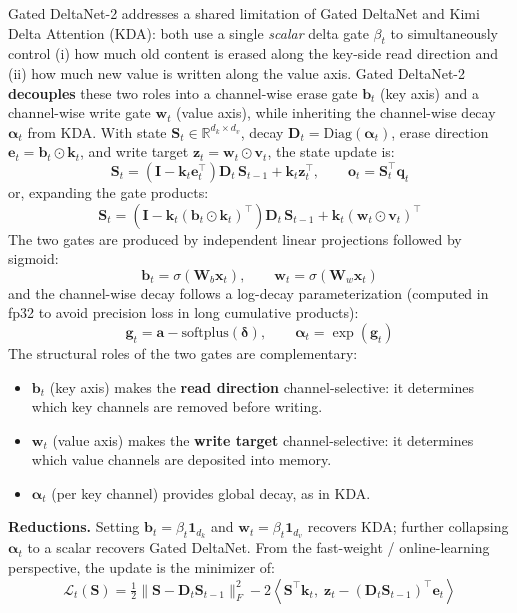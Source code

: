 \documentclass[11pt,a4paper]{article}
\begin{document}
Gated DeltaNet-2 \citep{hatamizadeh_gated_deltanet2_2026} addresses a shared limitation of Gated DeltaNet and Kimi Delta Attention (KDA): both use a single \emph{scalar} delta gate $\beta_t$ to simultaneously control (i) how much old content is erased along the key-side read direction and (ii) how much new value is written along the value axis. Gated DeltaNet-2 \textbf{decouples} these two roles into a channel-wise erase gate $\mathbf{b}_t$ (key axis) and a channel-wise write gate $\mathbf{w}_t$ (value axis), while inheriting the channel-wise decay $\boldsymbol{\alpha}_t$ from KDA. With state $\mathbf{S}_t \in \mathbb{R}^{d_k \times d_v}$, decay $\mathbf{D}_t = \mathrm{Diag}(\boldsymbol{\alpha}_t)$, erase direction $\mathbf{e}_t = \mathbf{b}_t \odot \mathbf{k}_t$, and write target $\mathbf{z}_t = \mathbf{w}_t \odot \mathbf{v}_t$, the state update is:
\[
\mathbf{S}_t = \left(\mathbf{I} - \mathbf{k}_t \mathbf{e}_t^\top\right) \mathbf{D}_t \, \mathbf{S}_{t-1} + \mathbf{k}_t \mathbf{z}_t^\top, \qquad \mathbf{o}_t = \mathbf{S}_t^\top \mathbf{q}_t
\]
or, expanding the gate products:
\[
\mathbf{S}_t = \left(\mathbf{I} - \mathbf{k}_t (\mathbf{b}_t \odot \mathbf{k}_t)^\top\right) \mathbf{D}_t \, \mathbf{S}_{t-1} + \mathbf{k}_t (\mathbf{w}_t \odot \mathbf{v}_t)^\top
\]
The two gates are produced by independent linear projections followed by sigmoid:
\[
\mathbf{b}_t = \sigma(\mathbf{W}_b \mathbf{x}_t), \qquad \mathbf{w}_t = \sigma(\mathbf{W}_w \mathbf{x}_t)
\]
and the channel-wise decay follows a log-decay parameterization (computed in fp32 to avoid precision loss in long cumulative products):
\[
\mathbf{g}_t = \mathbf{a} - \mathrm{softplus}(\boldsymbol{\delta}), \qquad \boldsymbol{\alpha}_t = \exp(\mathbf{g}_t)
\]
The structural roles of the two gates are complementary:
\begin{itemize}[leftmargin=*]
    \item $\mathbf{b}_t$ (key axis) makes the \textbf{read direction} channel-selective: it determines which key channels are removed before writing.
    \item $\mathbf{w}_t$ (value axis) makes the \textbf{write target} channel-selective: it determines which value channels are deposited into memory.
    \item $\boldsymbol{\alpha}_t$ (per key channel) provides global decay, as in KDA.
\end{itemize}
\textbf{Reductions.} Setting $\mathbf{b}_t = \beta_t \mathbf{1}_{d_k}$ and $\mathbf{w}_t = \beta_t \mathbf{1}_{d_v}$ recovers KDA; further collapsing $\boldsymbol{\alpha}_t$ to a scalar recovers Gated DeltaNet. From the fast-weight / online-learning perspective, the update is the minimizer of:
\[
\mathcal{L}_t(\mathbf{S}) = \tfrac{1}{2}\|\mathbf{S} - \mathbf{D}_t \mathbf{S}_{t-1}\|_F^2 - 2\left\langle \mathbf{S}^\top \mathbf{k}_t,\; \mathbf{z}_t - (\mathbf{D}_t \mathbf{S}_{t-1})^\top \mathbf{e}_t \right\rangle
\]
\end{document}
